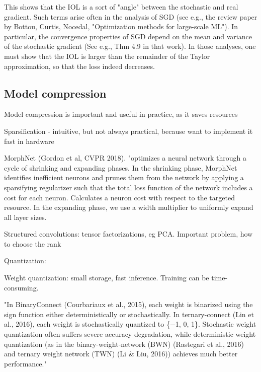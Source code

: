 \documentclass[english]{article}
\begin{document}
This shows that the IOL is a sort of "angle" between the stochastic and real gradient. Such terms arise often in the analysis of SGD (see e.g., the review paper by Bottou, Curtis, Nocedal, "Optimization methods for large-scale ML"). In particular, the convergence properties of SGD depend on the mean and variance of the stochastic gradient (See e.g., Thm 4.9 in that work). In those analyses, one must show that the IOL is larger than the remainder of the Taylor approximation, so that the loss indeed decreases. 

\eenum 



\subsection{Model compression}


\benum 
\item Model compression is important and useful in practice, as it saves resources

\item Sparsification - intuitive, but not always practical, because want to implement it fast in hardware 

MorphNet (Gordon et al, CVPR 2018). "optimizes a neural network through a cycle of shrinking and expanding phases. In the shrinking phase, MorphNet identifies inefficient neurons and prunes them from the network by applying a sparsifying regularizer such that the total loss function of the network includes a cost for each neuron. Calculates a neuron cost with respect to the targeted resource. In the expanding phase, we use a width multiplier to uniformly expand all layer sizes. 

\item Structured convolutions: tensor factorizations, eg PCA. Important problem, how to choose the rank

\item Quantization:

Weight quantization: small storage, fast inference. Training can be time-consuming. 

"In BinaryConnect (Courbariaux et al., 2015), each weight is binarized using the sign function either
deterministically or stochastically. In ternary-connect (Lin et al., 2016), each weight is stochastically
quantized to \{−1, 0, 1\}. Stochastic weight quantization often suffers severe accuracy degradation,
while deterministic weight quantization (as in the binary-weight-network (BWN) (Rastegari et al.,
2016) and ternary weight network (TWN) (Li \& Liu, 2016)) achieves much better performance."
\end{document}
